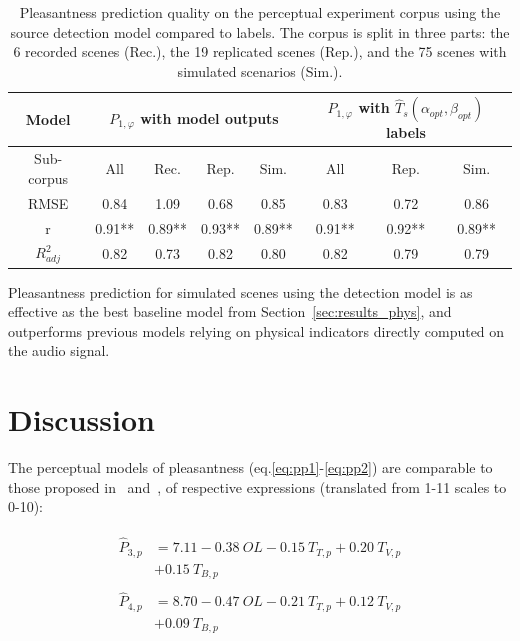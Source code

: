 \documentclass[twocolumn]{article}
\begin{document}
\begin{table}[t]
\centering
\caption{Pleasantness prediction quality on the perceptual experiment corpus using the source detection model compared to labels. The corpus is split in three parts: the 6 recorded scenes (Rec.), the 19 replicated scenes (Rep.), and the 75 scenes with simulated scenarios (Sim.).}
\label{tab:pppred}
\begin{tabular}{ c | c c c c | c c c }
\hline
	Model & \multicolumn{4}{|c}{$P_{1, \varphi}$ with model outputs} & \multicolumn{3}{|c}{$P_{1, \varphi}$ with $\hat T_s(\alpha_{opt}, \beta_{opt})$ labels} \\ \hline
	Sub-corpus & All & Rec. & Rep. & Sim. & All & Rep. & Sim. \\ \hline
	RMSE & 0.84 & 1.09 & 0.68 & 0.85 & 0.83 & 0.72 & 0.86 \\ \hline
	r & 0.91** & 0.89** & 0.93** & 0.89** & 0.91** & 0.92** & 0.89** \\ \hline
	$R^2_{adj}$ & 0.82 & 0.73 & 0.82 & 0.80 & 0.82 & 0.79 & 0.79 \\ \hline
\end{tabular}
\end{table}

Pleasantness prediction for simulated scenes using the detection model is as effective as the best baseline model from Section~\ref{sec:results_phys}, and outperforms previous models relying on physical indicators directly computed on the audio signal. %


\section{Discussion}
\label{sec:discussion}

The perceptual models of pleasantness (eq.\ref{eq:pp1}-\ref{eq:pp2}) are comparable to those proposed in~\cite{ricciardi2014} and~\cite{aumond2017}, of respective expressions (translated from 1-11 scales to 0-10):

\begin{align}
\begin{split}
\hat P_{3, p} {}&= 7.11 - 0.38~OL - 0.15~T_{T, p} + 0.20~T_{V, p} \\
& + 0.15~T_{B, p}
\end{split}\\
\begin{split}
\hat P_{4, p} {}&= 8.70 - 0.47~OL - 0.21~T_{T, p} + 0.12~T_{V, p} \\
& + 0.09~T_{B, p}
\end{split}
\end{align}
\end{document}
